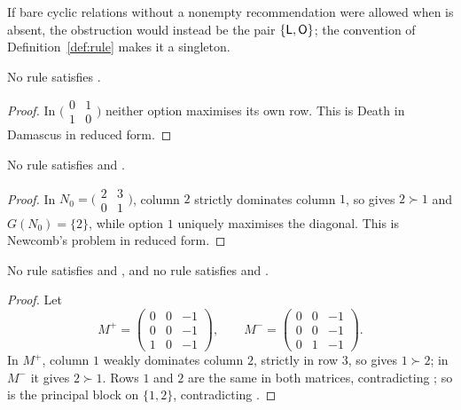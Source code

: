 If bare cyclic relations without a nonempty recommendation were allowed when  is absent, the
obstruction would instead be the pair $\{\textup{\textsf{L}},\textup{\textsf{O}}\}$; the convention of
Definition~\ref{def:rule} makes it a singleton.

\begin{proposition}\label{prop:J}
No rule satisfies .
\end{proposition}

\begin{proof}
In $\bigl(\begin{smallmatrix}0&1\\1&0\end{smallmatrix}\bigr)$ neither option maximises its own row.
This is Death in Damascus in reduced form.
\end{proof}

\begin{proposition}\label{prop:PD}
No rule satisfies  and .
\end{proposition}

\begin{proof}
In $N_0=\bigl(\begin{smallmatrix}2&3\\0&1\end{smallmatrix}\bigr)$, column $2$ strictly dominates column
$1$, so  gives $2\succ1$ and $G(N_0)=\{2\}$, while option $1$ uniquely maximises the diagonal.
This is Newcomb's problem in reduced form.
\end{proof}

\begin{proposition}\label{prop:PS}
No rule satisfies  and , and no rule satisfies  and .
\end{proposition}

\begin{proof}
Let
\[
  M^+=\begin{pmatrix}0&0&-1\\0&0&-1\\1&0&-1\end{pmatrix},\qquad
  M^-=\begin{pmatrix}0&0&-1\\0&0&-1\\0&1&-1\end{pmatrix}.
\]
In $M^+$, column $1$ weakly dominates column $2$, strictly in row $3$, so  gives $1\succ2$; in
$M^-$ it gives $2\succ1$. Rows $1$ and $2$ are the same in both matrices, contradicting ; so is
the principal block on $\{1,2\}$, contradicting .
\end{proof}

